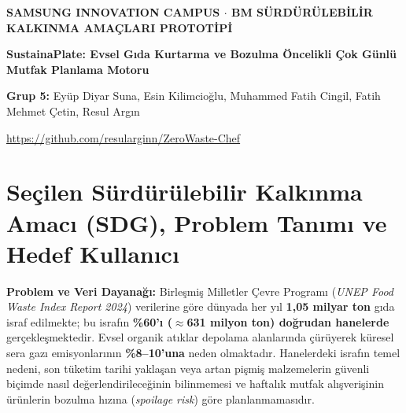 \documentclass[9pt,a4paper]{article}
\begin{document}
\shorthandoff{=}

\begin{tcolorbox}[
  enhanced,
  colback=undpblue,
  colframe=undpblue,
  arc=5pt,
  boxrule=0pt,
  left=8pt, right=8pt, top=5pt, bottom=5pt
]
  \begin{minipage}[c]{0.72\textwidth}
    {\fontsize{7.2}{8.8}\selectfont\bfseries\color{white!85!yellow} SAMSUNG INNOVATION CAMPUS $\cdot$ BM SÜRDÜRÜLEBİLİR KALKINMA AMAÇLARI PROTOTİPİ\par}\vspace{2pt}
    {\fontsize{13}{15.5}\selectfont\bfseries\color{white} SustainaPlate: Evsel Gıda Kurtarma ve Bozulma Öncelikli Çok Günlü Mutfak Planlama Motoru\par}\vspace{2.5pt}
    {\fontsize{7.8}{9.5}\selectfont\color{white!92} \textbf{Grup 5:} Eyüp Diyar Suna, Esin Kilimcioğlu, Muhammed Fatih Cingil, Fatih Mehmet Çetin, Resul Argın\par}
  \end{minipage}%
  \hfill
  \begin{minipage}[c]{0.26\textwidth}
    \raggedleft
    \leavevmode{}\par\vspace{1.5pt}
    \leavevmode{}\par\vspace{1.5pt}
    {\fontsize{6.8}{8}\selectfont\color{white!90} \url{https://github.com/resularginn/ZeroWaste-Chef}\par}
  \end{minipage}
\end{tcolorbox}
\vspace{-5pt}

\section{Seçilen Sürdürülebilir Kalkınma Amacı (SDG), Problem Tanımı ve Hedef Kullanıcı}
\textbf{Problem ve Veri Dayanağı:} Birleşmiş Milletler Çevre Programı (\emph{UNEP Food Waste Index Report 2024}) verilerine göre dünyada her yıl \textbf{1,05 milyar ton} gıda israf edilmekte; bu israfın \textbf{\%60'ı ($\approx$631 milyon ton) doğrudan hanelerde} gerçekleşmektedir. Evsel organik atıklar depolama alanlarında çürüyerek küresel sera gazı emisyonlarının \textbf{\%8--10'una} neden olmaktadır. Hanelerdeki israfın temel nedeni, son tüketim tarihi yaklaşan veya artan pişmiş malzemelerin güvenli biçimde nasıl değerlendirileceğinin bilinmemesi ve haftalık mutfak alışverişinin ürünlerin bozulma hızına (\emph{spoilage risk}) göre planlanmamasıdır.
\end{document}
